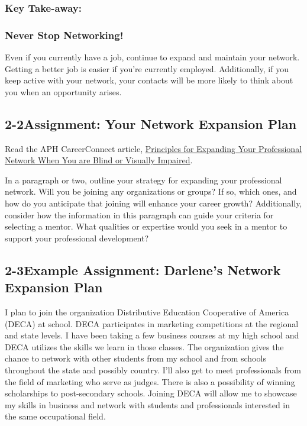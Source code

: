 \subsubsection*{Key Take-away:}
\subsubsection*{Never Stop Networking!}

Even if you currently have a job, continue to expand and maintain your network. Getting a better job is easier if you're currently employed. Additionally, if you keep active with your network, your contacts will be more likely to think about you when an opportunity arises.


\pagebreak \subsection*{2-2\quad Assignment: Your Network Expansion Plan}
Read the APH CareerConnect article, \href{https://aphconnectcenter.org/careerconnect-blog/principles-for-expanding-your-professional-network-when-you-are-blind-or-low-vision/}{Principles for Expanding Your Professional Network When You are Blind or Visually Impaired}.

In a paragraph or two, outline your strategy for expanding your professional network. Will you be joining any organizations or groups? If so, which ones, and how do you anticipate that joining will enhance your career growth? Additionally, consider how the information in this paragraph can guide your criteria for selecting a mentor. What qualities or expertise would you seek in a mentor to support your professional development?

\pagebreak \subsection*{2-3\quad Example Assignment: Darlene's Network Expansion Plan}
I plan to join the organization Distributive Education Cooperative of America (DECA) at school. DECA participates in marketing competitions at the regional and state levels. I have been taking a few business courses at my high school and DECA utilizes the skills we learn in those classes.
The organization gives the chance to network with other students from my school and from schools throughout the state and possibly country. I'll also get to meet professionals from the field of marketing who serve as judges. There is also a possibility of winning scholarships to post-secondary schools. Joining DECA will allow me to showcase my skills in business and network with students and professionals interested in the same occupational field.

